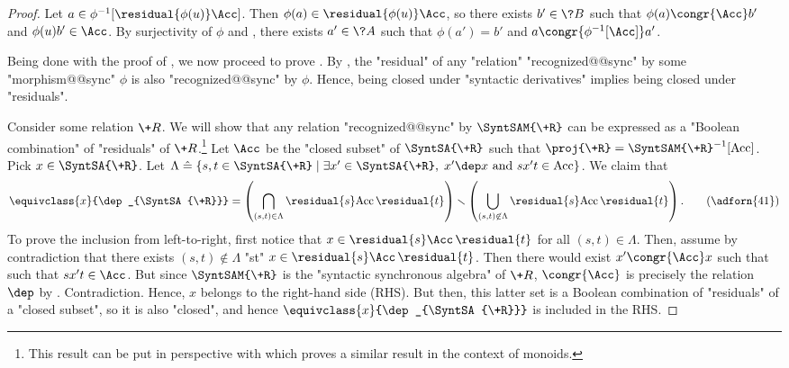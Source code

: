 \begin{proof}
	Let $a \in \phi^{-1}[\residual{\phi(u)}\Acc]$. Then
	$\phi(a) \in \residual{\phi(u)}\Acc$, so there
	exists $b' \in \?B$ such that $\phi(a) \congr{\Acc} b'$
	and $\phi(u)b' \in \Acc$. By surjectivity of $\phi$ and
	, there exists $a' \in \?A$ 
	such that $\phi(a') = b'$ and $a \congr{\phi^{-1}[\Acc]} a'$.

	Being done with the proof of ,
	we now proceed to prove .
	 By ,
	the "residual" of any "relation" "recognized@@sync" by some "morphism@@sync"
	$\phi$ is also "recognized@@sync" by $\phi$. Hence, being closed under
	"syntactic derivatives" implies being closed under "residuals".

	 Consider some relation $\+R$.
	We will show that any relation "recognized@@sync" by $\SyntSAM{\+R}$
	can be expressed as a "Boolean combination" of "residuals" of $\+R$.\footnote{This result can be 
	put in perspective with \cite[Lemma XIII.4.11, p.~229]{Pin2022MathematicalFoundations} which proves a similar result in the context of monoids.}
	Let $\Acc$ be the "closed subset" of $\SyntSA{\+R}$ such that
	$\proj{\+R} = \SyntSAM{\+R}^{-1}[\Acc]$. Pick $x \in \SyntSA{\+R}$.
	Let $\Lambda \defeq \{s, t \in \SyntSA{\+R} \mid \exists x'\in\SyntSA{\+R},\; x' \dep x \text{ and } sx't \in \Acc\}$.
	We claim that
	\begin{equation}
		\equivclass{x}{\dep_{\SyntSA{\+R}}} =
		\left(
			\bigcap_{(s,t) \in \Lambda} \residual{s} \Acc\,\residual{t}
		\right)
		\smallsetminus
		\left(
			\bigcup_{(s, t) \not\in \Lambda} \residual{s} \Acc\,\residual{t}
		\right).
		\label{eq:boolean-combination-of-residuals}
		\tag{\adforn{41}}
	\end{equation}
	To prove the inclusion from left-to-right, first
	notice that $x \in \residual{s} \Acc\,\residual{t}$ for all $(s, t) \in \Lambda$.
	Then, assume by contradiction that there exists $(s, t) \not\in \Lambda$ "st"
	$x \in \residual{s} \Acc\,\residual{t}$. Then there would exist $x' \congr{\Acc} x$ such that
	such that $sx't \in \Acc$. But since $\SyntSAM{\+R}$ is the "syntactic synchronous algebra"
	of $\+R$, $\congr{\Acc}$ is precisely the relation $\dep$ by . Contradiction.
	Hence, $x$ belongs to the right-hand side (RHS). But then, this latter set is
	a Boolean combination of "residuals" of a "closed subset", so it is also
	"closed", and hence $\equivclass{x}{\dep_{\SyntSA{\+R}}}$ is included in the RHS.


\end{proof}
